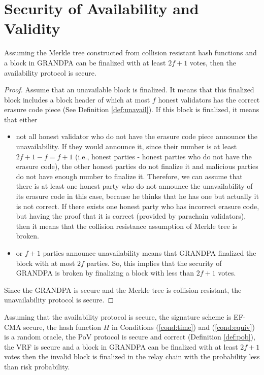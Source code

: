 \section{Security of Availability and Validity}


\begin{theorem}[Availability]
Assuming the Merkle tree constructed from collision resistant hash functions and a block in GRANDPA can be finalized with at least $2f+1$ votes, then the availability protocol is secure.
\end{theorem}

\begin{proof}
Assume that an unavailable block is finalized. It means that this finalized block includes a block header of which at most $f$ honest validators has the correct erasure code piece (See Definition \ref{def:unavail}). If this block is finalized, it means that either
\begin{itemize}
    \item not all honest validator who do not have the erasure code piece announce the unavailability. If they would announce it, since their number is at least $2f+1 - f =f+1$ (i.e., honest parties - honest parties who do not have the erasure code), the other honest parties do not finalize it and malicious parties do not have enough number to finalize it. Therefore, we can assume that there is at least one honest party who do not announce the unavailability of its erasure code in this case, because he thinks that he has one but actually it is not correct. If there exists one honest party who has incorrect erasure code, but having the proof that it is correct (provided by parachain validators), then it means that the collision resistance assumption of Merkle tree is broken. 
    
    \item or  $f+1$ parties announce unavailability means that GRANDPA finalized the block with at most $2f$  parties. So, this implies that the security of GRANDPA is broken by finalizing a block with less than $2f+1$ votes.
\end{itemize}

Since the GRANDPA is secure and the Merkle tree is collision resistant, the unavailability protocol is secure.
\end{proof}

\begin{theorem}[Validity]
\label{thm:valid}
Assuming that the availability protocol is secure, the signature scheme is EF-CMA secure, the hash function $H$ in Conditions (\ref{cond:time}) and  (\ref{cond:equiv}) is a random oracle, the PoV protocol is secure and correct (Definition \ref{def:pob}), the VRF is secure and a block in GRANDPA can be finalized with at least $2f+1$ votes then the invalid block is finalized in the relay chain with  the probability less than risk probability.
\end{theorem}

